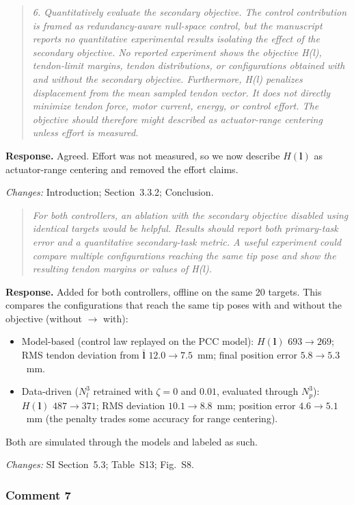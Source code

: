 \documentclass[11pt,a4paper]{article}
\newcommand{\rc}[1]{\begin{quote}\color{black!70}\itshape #1\end{quote}}
\begin{document}
\rc{6. Quantitatively evaluate the secondary objective. The control contribution is framed as redundancy-aware null-space control, but the manuscript reports no quantitative experimental results isolating the effect of the secondary objective. No reported experiment shows the objective H(l), tendon-limit margins, tendon distributions, or configurations obtained with and without the secondary objective. Furthermore, H(l) penalizes displacement from the mean sampled tendon vector. It does not directly minimize tendon force, motor current, energy, or control effort. The objective should therefore might described as actuator-range centering unless effort is measured.}
\textbf{Response.} Agreed. Effort was not measured, so we now describe $H(\mathbf{l})$ as actuator-range centering and removed the effort claims.

\textit{Changes:} Introduction; Section~3.3.2; Conclusion.

\rc{For both controllers, an ablation with the secondary objective disabled using identical targets would be helpful. Results should report both primary-task error and a quantitative secondary-task metric. A useful experiment could compare multiple configurations reaching the same tip pose and show the resulting tendon margins or values of H(l).}
\textbf{Response.} Added for both controllers, offline on the same 20 targets. This compares the configurations that reach the same tip poses with and without the objective (without $\to$ with):
\begin{itemize}
\item Model-based (control law replayed on the PCC model): $H(\mathbf{l})$ $693 \to 269$; RMS tendon deviation from $\bar{\mathbf{l}}$ $12.0 \to 7.5$~mm; final position error $5.8 \to 5.3$~mm.
\item Data-driven ($N_l^3$ retrained with $\zeta = 0$ and $0.01$, evaluated through $N_p^3$): $H(\mathbf{l})$ $487 \to 371$; RMS deviation $10.1 \to 8.8$~mm; position error $4.6 \to 5.1$~mm (the penalty trades some accuracy for range centering).
\end{itemize}
Both are simulated through the models and labeled as such.

\textit{Changes:} SI Section~5.3; Table~S13; Fig.~S8.

\subsubsection*{Comment 7}
\end{document}

